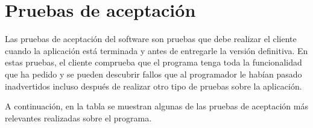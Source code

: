 
\newpage


\section{Pruebas de aceptación}
Las pruebas de aceptación del software son pruebas que debe realizar el cliente cuando la aplicación está terminada y antes de entregarle la versión definitiva. En estas pruebas, el cliente comprueba que el programa tenga toda la funcionalidad que ha pedido y se pueden descubrir fallos que al programador le habían pasado inadvertidos incluso después de realizar otro tipo de pruebas sobre la aplicación.

A continuación, en la tabla  se muestran algunas de las pruebas de aceptación más relevantes realizadas sobre el programa.

